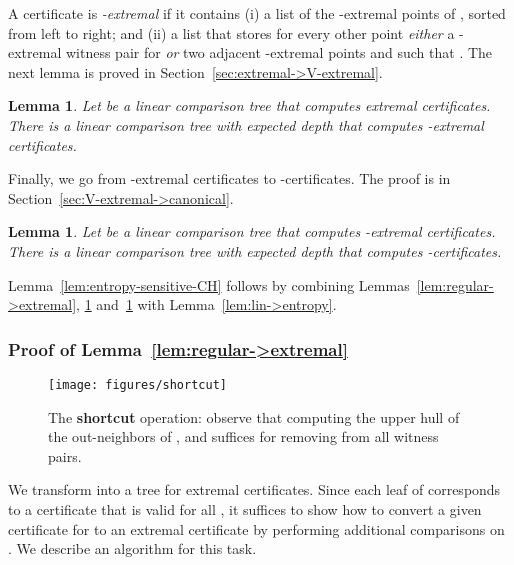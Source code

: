 \documentclass[letterpaper,11pt]{article}
\newtheorem{lemma}[theorem]{Lemma}
\begin{document}
A certificate is 
\emph{\textup{}-extremal} if 
it contains (i) a list of the 
-extremal points of , sorted 
from left to right; and (ii) a list that stores 
for every other point  \emph{either} 
a -extremal witness pair
for  \emph{or} two adjacent 
-extremal points  and  such 
that . The next 
lemma is proved in 
Section~\ref{sec:extremal->V-extremal}.

\begin{lemma}\label{lem:extremal->V-extremal}
  Let  be a linear comparison tree 
  that computes extremal certificates.
  There is a linear comparison tree 
  with expected depth  that computes 
  -extremal certificates.
\end{lemma}

Finally, we go from
-extremal certificates to 
-certificates. 
The proof is in Section~\ref{sec:V-extremal->canonical}.

\begin{lemma}\label{lem:V-extremal->canonical}
  Let  be a linear comparison tree 
  that computes -extremal 
  certificates. There is a linear 
  comparison tree with expected depth 
   that computes -certificates. 
\end{lemma}

Lemma~\ref{lem:entropy-sensitive-CH} follows by
combining Lemmas~\ref{lem:regular->extremal},
\ref{lem:extremal->V-extremal} 
and~\ref{lem:V-extremal->canonical}
with Lemma~\ref{lem:lin->entropy}.

\subsubsection{Proof of Lemma~\ref{lem:regular->extremal}}
\label{sec:regular->extremal}
 
\begin{figure}
  \centering
  \texttt{[image: figures/shortcut]}
  \caption{ The \textbf{shortcut} operation: 
    observe that computing the upper hull 
    of the out-neighbors of , and  suffices
    for removing  from all witness pairs.}
  \label{fig:shortcut}
\end{figure}

We transform  into a tree for 
extremal certificates. Since each leaf 
 of  corresponds to a certificate 
that is valid for all , it suffices 
to show how to convert a given certificate 
 for  to an extremal 
certificate by performing  additional 
comparisons on . We 
describe an algorithm for this task.
\end{document}

